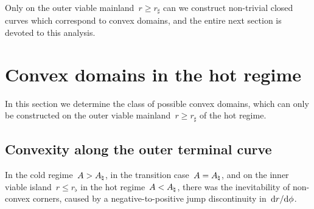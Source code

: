 Only on the outer viable mainland~$r \ge r_\sharp$
can we construct non-trivial closed curves
which correspond to convex domains,
and the entire next section is devoted to this analysis.

\section{Convex domains in the hot regime}
\label{sec:polar.convex}

In this section
we determine the class of possible convex domains,
which can only be constructed
on the outer viable mainland~$r \ge r_\sharp$
of the hot regime.

\subsection{Convexity along the outer terminal curve}
\label{sec:polar.convex.terminal}

In the cold regime~$A > A_\natural$, in the transition case~$A = A_\natural$,
and on the inner viable island~$r \le r_\flat$
in the hot regime~$A < A_\natural$,
there was the inevitability of non-convex corners,
caused by a negative-to-positive jump discontinuity in~$\mathop{}\!\mathrm{d} r / {\mathop{}\!\mathrm{d}\phi}$.

